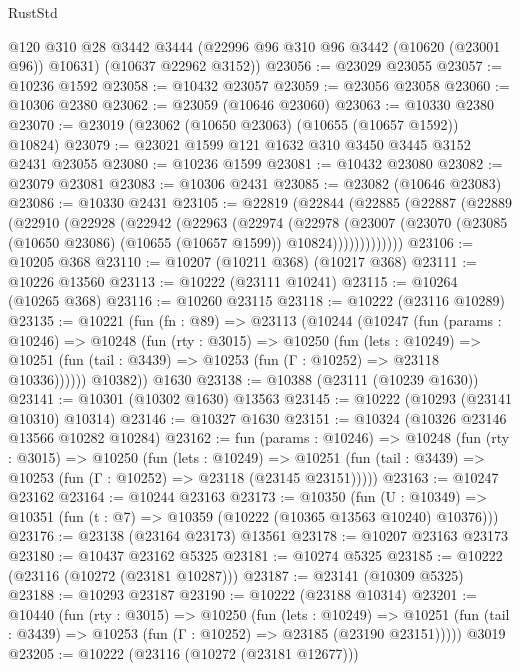\begin{lexlean}{RustStd}
\begin{coremodule}
      @120
      @310
      @28
      @3442
      @3444
      (@22996 @96 @310 @96 @3442 (@10620 (@23001 @96)) @10631)
      (@10637 @22962 @3152))
@23056 := @23029 @23055
@23057 := @10236 @1592
@23058 := @10432 @23057
@23059 := @23056 @23058
@23060 := @10306 @2380
@23062 := @23059 (@10646 @23060)
@23063 := @10330 @2380
@23070 := @23019 (@23062 (@10650 @23063) (@10655 (@10657 @1592)) @10824)
@23079 := @23021 @1599 @121 @1632 @310 @3450 @3445 @3152 @2431 @23055
@23080 := @10236 @1599
@23081 := @10432 @23080
@23082 := @23079 @23081
@23083 := @10306 @2431
@23085 := @23082 (@10646 @23083)
@23086 := @10330 @2431
@23105 := @22819
    (@22844
      (@22885
        (@22887
          (@22889
            (@22910
              (@22928
                (@22942
                  (@22963
                    (@22974
                      (@22978
                        (@23007
                          (@23070
                            (@23085 (@10650 @23086) (@10655 (@10657 @1599)) @10824)))))))))))))
@23106 := @10205 @368
@23110 := @10207 (@10211 @368) (@10217 @368)
@23111 := @10226 @13560
@23113 := @10222 (@23111 @10241)
@23115 := @10264 (@10265 @368)
@23116 := @10260 @23115
@23118 := @10222 (@23116 @10289)
@23135 := @10221
    (fun (fn : @89) =>
    @23113
      (@10244
        (@10247
          (fun (params : @10246) =>
          @10248
            (fun (rty : @3015) =>
            @10250
              (fun (lets : @10249) =>
              @10251 (fun (tail : @3439) => @10253 (fun (Γ : @10252) => @23118 @10336))))))
        @10382))
    @1630
@23138 := @10388 (@23111 (@10239 @1630))
@23141 := @10301 (@10302 @1630) @13563
@23145 := @10222 (@10293 (@23141 @10310) @10314)
@23146 := @10327 @1630
@23151 := @10324 (@10326 @23146 @13566 @10282 @10284)
@23162 := fun (params : @10246) =>
  @10248
    (fun (rty : @3015) =>
    @10250
      (fun (lets : @10249) =>
      @10251 (fun (tail : @3439) => @10253 (fun (Γ : @10252) => @23118 (@23145 @23151)))))
@23163 := @10247 @23162
@23164 := @10244 @23163
@23173 := @10350
    (fun (U : @10349) => @10351 (fun (t : @7) => @10359 (@10222 (@10365 @13563 @10240) @10376)))
@23176 := @23138 (@23164 @23173) @13561
@23178 := @10207 @23163 @23173
@23180 := @10437 @23162 @5325
@23181 := @10274 @5325
@23185 := @10222 (@23116 (@10272 (@23181 @10287)))
@23187 := @23141 (@10309 @5325)
@23188 := @10293 @23187
@23190 := @10222 (@23188 @10314)
@23201 := @10440
    (fun (rty : @3015) =>
    @10250
      (fun (lets : @10249) =>
      @10251 (fun (tail : @3439) => @10253 (fun (Γ : @10252) => @23185 (@23190 @23151)))))
    @3019
@23205 := @10222 (@23116 (@10272 (@23181 @12677)))

\end{coremodule}
\end{lexlean}
